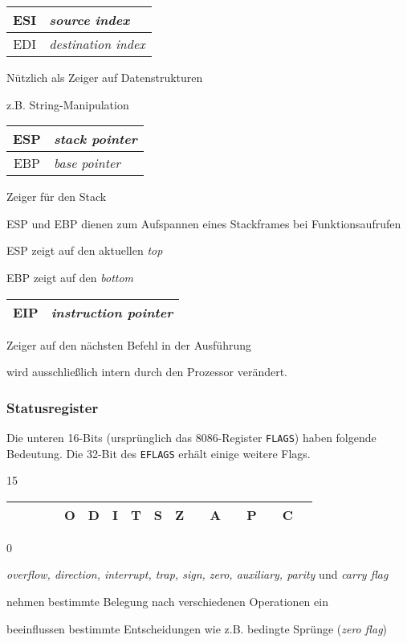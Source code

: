 \begin{tabular}{|c|l|}
\hline ESI & \emph{source index} \\
\hline EDI & \emph{destination index} \\
\hline
\end{tabular}

Nützlich als Zeiger auf Datenstrukturen

z.B. String-Manipulation


\begin{tabular}{|c|l|}
\hline ESP & \emph{stack pointer}\\
\hline EBP & \emph{base pointer} \\
\hline
\end{tabular}

Zeiger für den Stack

ESP und EBP dienen zum Aufspannen eines Stackframes bei Funktionsaufrufen

ESP zeigt auf den aktuellen \emph{top}

EBP zeigt auf den \emph{bottom}

\begin{tabular}{|c|l|}
\hline EIP & \emph{instruction pointer} \\
\hline
\end{tabular}

Zeiger auf den nächsten Befehl in der Ausführung

wird ausschließlich intern durch den Prozessor verändert.

\subsubsection{Statusregister}

Die unteren 16-Bits (ursprünglich das 8086-Register {\tt FLAGS}) haben folgende Bedeutung. Die 32-Bit des {\tt EFLAGS} erhält einige weitere Flags.

{\small 15}
\begin{tabular}{|c|c|c|c|c|c|c|c|c|c|c|c|c|c|c|c|c|}
\hline & & & & O & D & I & T & S & Z & & A & & P & & C \\
\hline
\end{tabular}
{\small 0}

\emph{overflow, direction, interrupt, trap, sign, zero, auxiliary, parity}
und \emph{carry flag} 

nehmen bestimmte Belegung nach verschiedenen Operationen ein

beeinflussen bestimmte Entscheidungen wie z.B. bedingte Sprünge (\emph{zero flag})


